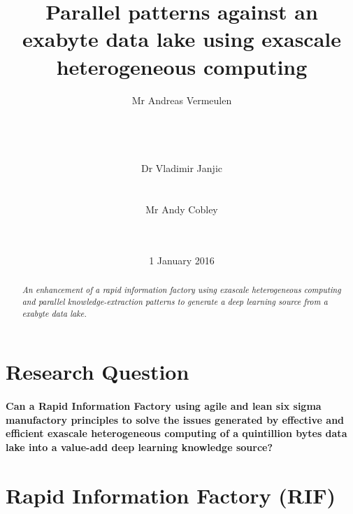 \documentclass{acm_proc_article-sp}
\begin{document}
\title{Parallel patterns against an exabyte data lake using exascale heterogeneous computing}
\subtitle{}
\author{
\alignauthor
Mr Andreas Vermeulen\\
\\
\\
\\
\\
\alignauthor
Dr Vladimir Janjic\\
\\
\\
\alignauthor
Mr Andy Cobley\\
\\
\\
}
\date{1 January 2016}
\maketitle
\begin{abstract}
\textit{An enhancement of a rapid information factory using exascale heterogeneous computing and parallel knowledge-extraction patterns to generate a deep learning source from a exabyte data lake.}
\end{abstract}
\section{Research Question}
\paragraph{Can a Rapid Information Factory using agile and lean six sigma manufactory principles to solve the issues generated by effective and efficient exascale heterogeneous computing of a quintillion bytes data lake into a value-add deep learning knowledge source?}
\pagebreak
\section{Rapid Information Factory (RIF)}
\end{document}
